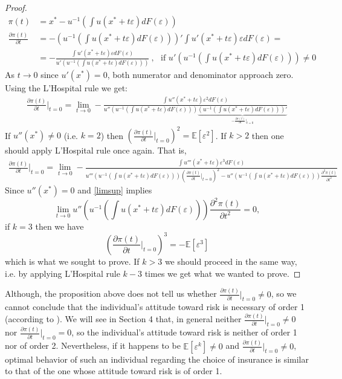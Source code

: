 \documentclass[a4paper]{article}
\newcommand{\expect}{\mathbb{E}}
\newcommand{\eps}{\varepsilon}
\begin{document}
\begin{proof}
	\begin{align*}
		\pi(t) &= x^* - u^{-1}\left( \int u(x^* + t \varepsilon) dF(\varepsilon) \right)\\
		\frac{\partial \pi(t)}{\partial t} &= -\left(u^{-1}\left( \int u(x^* + t \varepsilon) dF(\varepsilon) \right) \right)' \int u'(x^*+t \varepsilon)\varepsilon dF(\varepsilon) = \\
		&=-\frac{\int u'(x^*+t \varepsilon)\varepsilon dF(\varepsilon)}{u'\left(u^{-1}\left( \int u(x^* + t \varepsilon) dF(\varepsilon) \right)\right)}\ ,\ \ \  \text{if }u'\left(u^{-1}\left( \int u(x^* + t \varepsilon) dF(\varepsilon) \right)\right) \neq 0
	\end{align*}
As $t \to 0$ since $u'(x^*) = 0$, both numerator and denominator approach zero.
Using the L'Hospital rule we get:
\begin{align*}
		\frac{\partial \pi(t)}{\partial t} \bigg|_{t = 0} = \lim_{t \to 0} -\frac{\int u''(x^*+t \varepsilon) \varepsilon^2 dF(\varepsilon)}{u''\left(u^{-1}\left( \int u(x^* + t \varepsilon) dF(\varepsilon) \right)\right) \underbrace{\left(u^{-1}\left( \int u(x^* + t \varepsilon) dF(\varepsilon) \right) \right)'}_{-\frac{\partial \pi(t)}{\partial t} \bigg|_{t = 0}}}
\end{align*}
If $u''(x^*) \neq 0$ (i.e. $k=2$) then $\left( \frac{\partial \pi(t)}{\partial t} \bigg|_{t = 0} \right)^2 = \expect[\varepsilon^2]$. If $k>2$ then one should apply L'Hospital rule once again. That is,
\begin{align*}
	\frac{\partial \pi(t)}{\partial t} \bigg|_{t = 0} = \lim_{t \to 0} -\frac{\int u'''(x^*+t \varepsilon) \varepsilon^3 dF(\varepsilon)}{u'''\left(u^{-1}\left( \int u(x^* + t \varepsilon) dF(\varepsilon) \right)\right) \left( \frac{\partial \pi(t)}{\partial t} \bigg|_{t = 0}\right)^2 - u''\left(u^{-1}\left( \int u(x^* + t \varepsilon) dF(\varepsilon) \right)\right) \frac{\partial^2\pi(t)}{\partial t^2} }
\end{align*}
Since $u''(x^*) = 0$ and \eqref{limsup} implies  $$\lim_{t \to 0} u''\left(u^{-1}\left( \int u(x^* + t \varepsilon) dF(\varepsilon) \right)\right) \frac{\partial^2\pi(t)}{\partial t^2} = 0,$$ if $k=3$ then we have $$\left( \frac{\partial \pi(t)}{\partial t} \bigg|_{t=0}\right)^3 = -\expect[\eps^3] $$ which is what we sought to prove. If $k>3$ we should proceed in the same way, i.e. by applying L'Hospital rule $k-3$ times we get what we wanted to prove.
\end{proof}
Although, the proposition above does not tell us whether $\frac{\partial \pi(t)}{\partial t} \bigg|_{t = 0} \neq 0$, so we cannot conclude that the individual's attitude toward risk is necessary of order 1 (according to \cite{segal1990first}). We will see in Section 4 that, in general neither $\frac{\partial \pi(t)}{\partial t}\bigg|_{t=0} \neq 0$ nor $\frac{\partial \pi(t)}{\partial t}\bigg|_{t=0} = 0$, so the individual's attitude toward risk is neither of order 1 nor of order 2. Nevertheless, if it happens to be $\expect[\eps^k] \neq 0$ and $\frac{\partial \pi(t)}{\partial t}\bigg|_{t=0} \neq 0$, optimal behavior of such an individual regarding the choice of insurance is similar to that of the one whose attitude toward risk is of order 1.
\end{document}

